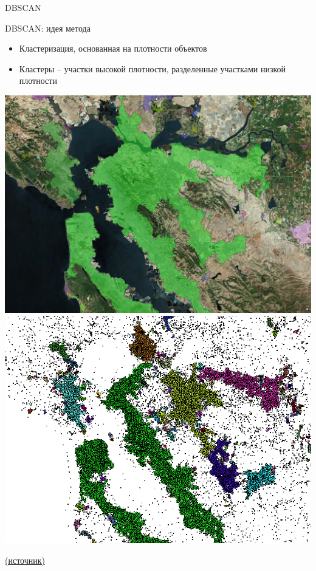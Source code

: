\documentclass[10pt]{beamer}
\begin{document}
\begin{frame}

\begin{center}
{\Large DBSCAN}
\end{center}

\end{frame}

\begin{frame}{DBSCAN: идея метода}

\begin{itemize}
\item Кластеризация, основанная на плотности объектов
\item Кластеры -- участки высокой плотности, разделенные участками низкой плотности
\end{itemize}

\vspace{1em}
\begin{center}
\includegraphics[height=0.4\textheight]{images/dbscan1.png}
\includegraphics[height=0.4\textheight]{images/dbscan2.png}
\end{center}
\href{http://biarri.com/spatial-clustering-in-c-post-2-of-5-running-dbscan/}{(источник)}

\end{frame}
\end{document}
